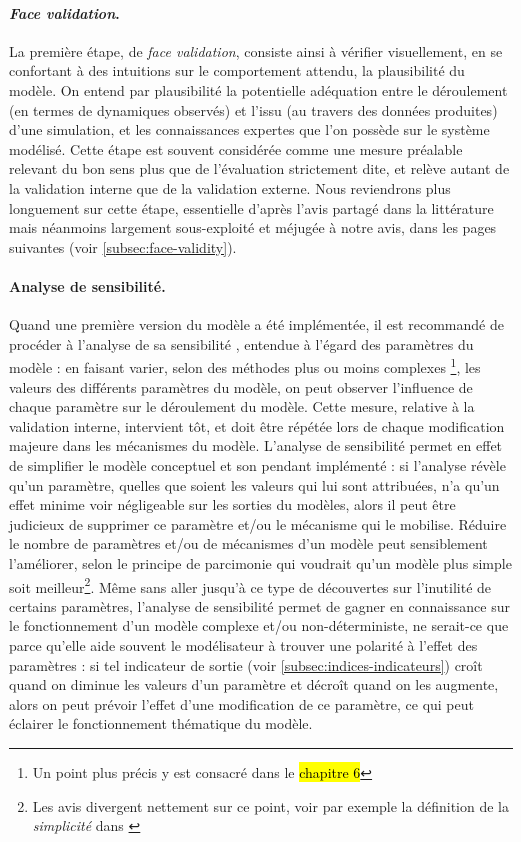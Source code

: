 \paragraph{\og \textit{Face validation}\fg{}.}
La première étape, de \og \textit{face validation}\fg{}, consiste ainsi à vérifier visuellement, en se confortant à des intuitions sur le comportement attendu, la plausibilité du modèle.
On entend par plausibilité la potentielle adéquation entre le déroulement (en termes de dynamiques observés) et l'issu (au travers des données produites) d'une simulation, et les connaissances expertes que l'on possède sur le système modélisé.
Cette étape est souvent considérée comme une mesure préalable relevant du bon sens plus que de l'évaluation strictement dite, et relève autant de la validation interne que de la validation externe.
Nous reviendrons plus longuement sur cette étape, essentielle d'après l'avis partagé dans la littérature mais néanmoins largement sous-exploité et méjugée à notre avis, dans les pages suivantes (voir \cref{subsec:face-validity}).

\paragraph{Analyse de sensibilité.}
Quand une première version du modèle a été implémentée, il est recommandé de procéder à l'analyse de sa \og sensibilité \fg{}, entendue à l'égard des paramètres du modèle : en faisant varier, selon des méthodes plus ou moins complexes
\footnote{
	Un point plus précis y est consacré dans le \hl{chapitre 6}
}, les valeurs des différents paramètres du modèle, on peut observer l'influence de chaque paramètre sur le déroulement du modèle.
Cette mesure, relative à la validation interne, intervient tôt, et doit être répétée lors de chaque modification majeure dans les mécanismes du modèle.
L'analyse de sensibilité permet en effet de simplifier le modèle conceptuel et son pendant implémenté :
	si l'analyse révèle qu'un paramètre, quelles que soient les valeurs qui lui sont attribuées, n'a qu'un effet minime voir négligeable sur les sorties du modèles, alors il peut être judicieux de supprimer ce paramètre et/ou le mécanisme qui le mobilise.
Réduire le nombre de paramètres et/ou de mécanismes d'un modèle peut sensiblement l'améliorer, selon le principe de parcimonie qui voudrait qu'un modèle plus simple soit meilleur\footnote{
	Les avis divergent nettement sur ce point, voir par exemple la définition de la \textit{simplicité} dans \textcite[120]{amblard_evaluation_2006}
}.
Même sans aller jusqu'à ce type de découvertes sur l'inutilité de certains paramètres, l'analyse de sensibilité permet de gagner en connaissance sur le fonctionnement d'un modèle complexe et/ou non-déterministe, ne serait-ce que parce qu'elle aide souvent le modélisateur à trouver une \og polarité \fg{} à l'effet des paramètres :
	si tel indicateur de sortie (voir \cref{subsec:indices-indicateurs}) croît quand on diminue les valeurs d'un paramètre et décroît quand on les augmente, alors on peut prévoir l'effet d'une modification de ce paramètre, ce qui peut éclairer le fonctionnement thématique du modèle.


